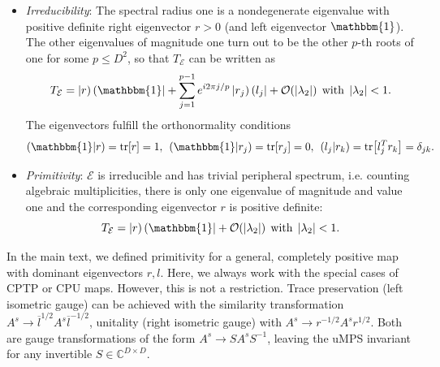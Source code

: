 \begin{itemize}
	\item \textit{Irreducibility}: The spectral radius one is a nondegenerate eigenvalue with positive definite right eigenvector $r > 0$ (and left eigenvector $\mathbbm{1}$). The other eigenvalues of magnitude one turn out to be the other $p$-th roots of one for some $p \leq D^2$, so that $T_{\mathcal{E}}$ can be written as
	\begin{equation}
	T_{\mathcal{E}} = \tket{r}\tbra{\mathbbm{1}} + \sum\limits_{j=1}^{p-1}e^{i2\pi j/p} \tket{r_j}\tbra{l_j} + \mathcal{O}(\vert \lambda_2 \vert) \:\:\mathrm{with}\:\: \vert \lambda_2 \vert < 1.
	\end{equation}
	The eigenvectors fulfill the orthonormality conditions 
	\begin{equation}
	( \mathbbm{1} \vert r ) = \tr [r] = 1, \:\: ( \mathbbm{1} \vert r_j ) = \tr [r_j] = 0, \:\: ( l_j \vert r_k ) = \tr [l_j^{T} r_k] = \delta_{jk}.
	\end{equation}
	
	\item \textit{Primitivity}: $\mathcal{E}$ is irreducible and has trivial peripheral spectrum, i.e. counting algebraic multiplicities, there is only one eigenvalue of magnitude and value one and the corresponding eigenvector $r$ is positive definite:
	\begin{equation}
		T_{\mathcal{E}} = \tket{r}\tbra{\mathbbm{1}} + \mathcal{O}(\vert \lambda_2 \vert) \:\:\mathrm{with}\:\: \vert \lambda_2 \vert < 1.
	\end{equation}
\end{itemize}

\noindent In the main text, we defined primitivity for a general, completely positive map with dominant eigenvectors $r, l$. Here, we always work with the special cases of CPTP or CPU maps. However, this is not a restriction. Trace preservation (left isometric gauge) can be achieved with the similarity transformation $A^s \rightarrow \overline{l}^{1/2} A^s \overline{l}^{-1/2}$, unitality (right isometric gauge) with $A^s \rightarrow r^{-1/2} A^s r^{1/2}$. Both are gauge transformations of the form $A^s \rightarrow S A^s S^{-1}$, leaving the uMPS invariant for any invertible $S \in \mathbb{C}^{D \times D}$. \\

